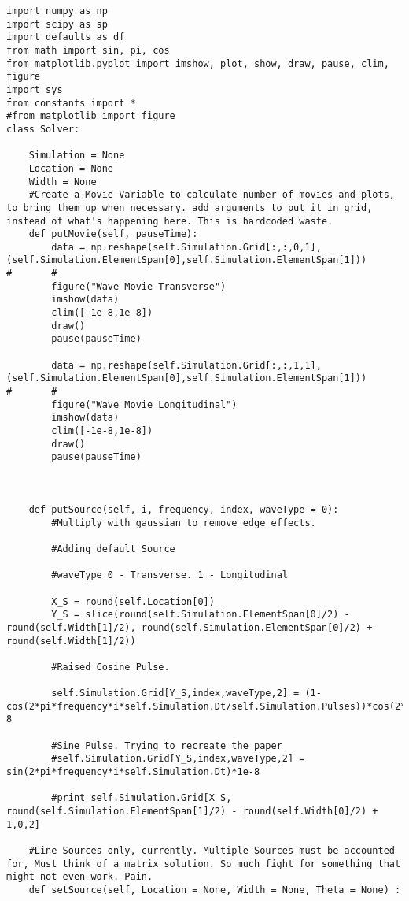 \begin{lstlisting}
import numpy as np
import scipy as sp
import defaults as df
from math import sin, pi, cos
from matplotlib.pyplot import imshow, plot, show, draw, pause, clim, figure
import sys
from constants import *
#from matplotlib import figure
class Solver:

    Simulation = None
    Location = None
    Width = None
    #Create a Movie Variable to calculate number of movies and plots, to bring them up when necessary. add arguments to put it in grid, instead of what's happening here. This is hardcoded waste.
    def putMovie(self, pauseTime):
        data = np.reshape(self.Simulation.Grid[:,:,0,1],  (self.Simulation.ElementSpan[0],self.Simulation.ElementSpan[1]))       #       # 
        figure("Wave Movie Transverse")
        imshow(data)
        clim([-1e-8,1e-8])
        draw()
        pause(pauseTime)
        
        data = np.reshape(self.Simulation.Grid[:,:,1,1],  (self.Simulation.ElementSpan[0],self.Simulation.ElementSpan[1]))       #       # 
        figure("Wave Movie Longitudinal")
        imshow(data)
        clim([-1e-8,1e-8])
        draw()
        pause(pauseTime)
 
       
            
    def putSource(self, i, frequency, index, waveType = 0):
        #Multiply with gaussian to remove edge effects.
        
        #Adding default Source
        
        #waveType 0 - Transverse. 1 - Longitudinal
        
        X_S = round(self.Location[0]) 
        Y_S = slice(round(self.Simulation.ElementSpan[0]/2) - round(self.Width[1]/2), round(self.Simulation.ElementSpan[0]/2) + round(self.Width[1]/2))
      
        #Raised Cosine Pulse.
        
        self.Simulation.Grid[Y_S,index,waveType,2] = (1-cos(2*pi*frequency*i*self.Simulation.Dt/self.Simulation.Pulses))*cos(2*pi*frequency*i*self.Simulation.Dt)*1e-8
        
        #Sine Pulse. Trying to recreate the paper
        #self.Simulation.Grid[Y_S,index,waveType,2] = sin(2*pi*frequency*i*self.Simulation.Dt)*1e-8

        #print self.Simulation.Grid[X_S, round(self.Simulation.ElementSpan[1]/2) - round(self.Width[0]/2) + 1,0,2]
            
    #Line Sources only, currently. Multiple Sources must be accounted for, Must think of a matrix solution. So much fight for something that might not even work. Pain.
    def setSource(self, Location = None, Width = None, Theta = None) :
        

\end{lstlisting}
